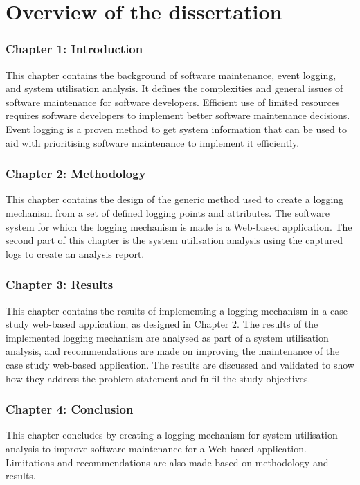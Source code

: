 \section{Overview of the dissertation}
\subsubsection{Chapter 1: Introduction}
This chapter contains the background of software maintenance, event logging, and system utilisation analysis. It defines the complexities and general issues of software maintenance for software developers. Efficient use of limited resources requires software developers to implement better software maintenance decisions. Event logging is a proven method to get system information that can be used to aid with prioritising software maintenance to implement it efficiently.

\subsubsection{Chapter 2: Methodology}
This chapter contains the design of the generic method used to create a logging mechanism from a set of defined logging points and attributes. The software system for which the logging mechanism is made is a Web-based application. The second part of this chapter is the system utilisation analysis using the captured logs to create an analysis report.

\subsubsection{Chapter 3: Results}
This chapter contains the results of implementing a logging mechanism in a case study web-based application, as designed in Chapter 2. The results of the implemented logging mechanism are analysed as part of a system utilisation analysis, and recommendations are made on improving the maintenance of the case study web-based application. The results are discussed and validated to show how they address the problem statement and fulfil the study objectives.

\subsubsection{Chapter 4: Conclusion}
This chapter concludes by creating a logging mechanism for system utilisation analysis to improve software maintenance for a Web-based application. Limitations and recommendations are also made based on methodology and results.
